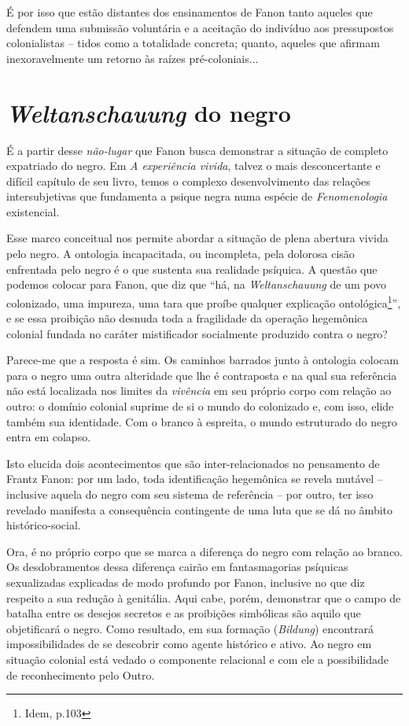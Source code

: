 É por isso que estão distantes dos ensinamentos de Fanon tanto aqueles
que defendem uma submissão voluntária e a aceitação do indivíduo aos
pressupostos colonialistas -- tidos como a totalidade concreta; quanto,
aqueles que afirmam inexoravelmente um retorno às raízes
pré-coloniais...

\chapter{\emph{Weltanschauung} do negro}

É a partir desse \emph{não-lugar} que Fanon busca demonstrar a situação
de completo expatriado do negro. Em \emph{A experiência vivida}, talvez
o mais desconcertante e difícil capítulo de seu livro, temos o complexo
desenvolvimento das relações intersubjetivas que fundamenta a psique
negra numa espécie de \emph{Fenomenologia} existencial.

Esse marco conceitual nos permite abordar a situação de plena abertura
vivida pelo negro. A ontologia incapacitada, ou incompleta, pela
dolorosa cisão enfrentada pelo negro é o que sustenta sua realidade
psíquica. A questão que podemos colocar para Fanon, que diz que ``há, na
\emph{Weltanschauung} de um povo colonizado, uma impureza, uma tara que
proíbe qualquer explicação ontológica\footnote{Idem, p.103}'', e se essa
proibição não desnuda toda a fragilidade da operação hegemônica colonial
fundada no caráter mistificador socialmente produzido contra o negro?

Parece-me que a resposta é sim. Os caminhos barrados junto à ontologia
colocam para o negro uma outra alteridade que lhe é contraposta e na
qual sua referência não está localizada nos limites da \emph{vivência}
em seu próprio corpo com relação ao outro: o domínio colonial suprime de
si o mundo do colonizado e, com isso, elide também sua identidade. Com o
branco à espreita, o mundo estruturado do negro entra em colapso.

Isto elucida dois acontecimentos que são inter-relacionados no
pensamento de Frantz Fanon: por um lado, toda identificação hegemônica
se revela mutável -- inclusive aquela do negro com seu sistema de
referência -- por outro, ter isso revelado manifesta a consequência
contingente de uma luta que se dá no âmbito histórico-social.

Ora, é no próprio corpo que se marca a diferença do negro com relação ao
branco. Os desdobramentos dessa diferença cairão em fantasmagorias
psíquicas sexualizadas explicadas de modo profundo por Fanon, inclusive
no que diz respeito a sua redução à genitália. Aqui cabe, porém,
demonstrar que o campo de batalha entre os desejos secretos e as
proibições simbólicas são aquilo que objetificará o negro. Como
resultado, em sua formação (\emph{Bildung}) encontrará impossibilidades
de se descobrir como agente histórico e ativo. Ao negro em situação
colonial está vedado o componente relacional e com ele a possibilidade
de reconhecimento pelo Outro.

